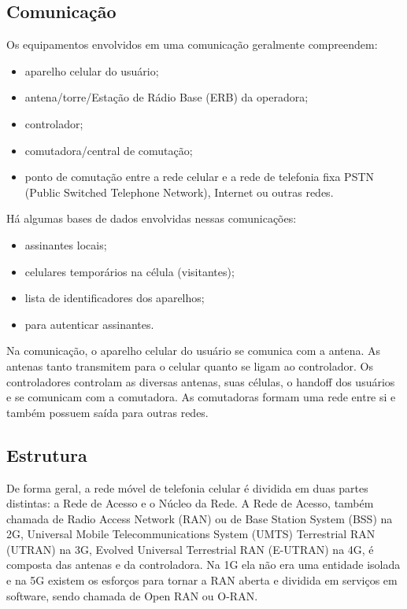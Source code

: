 \documentclass[11pt,oneside,a4paper]{abntex2}
\begin{document}
\subsection*{Comunicação}

Os equipamentos envolvidos em uma comunicação geralmente compreendem:
\begin{itemize}
	\item aparelho celular do usuário;
	\item antena/torre/Estação de Rádio Base (ERB) da operadora;
	\item controlador;
	\item comutadora/central de comutação;
	\item ponto de comutação entre a rede celular e a rede de telefonia fixa PSTN (Public Switched Telephone Network), Internet ou outras redes.
\end{itemize}

Há algumas bases de dados envolvidas nessas comunicações:
\begin{itemize}
	\item assinantes locais;
	\item celulares temporários na célula (visitantes);
	\item lista de identificadores dos aparelhos;
	\item para autenticar assinantes.
\end{itemize}

Na comunicação, o aparelho celular do usuário se comunica com a antena. As antenas tanto transmitem para o celular quanto se ligam ao controlador. Os controladores controlam as diversas antenas, suas células, o handoff dos usuários e se comunicam com a comutadora. As comutadoras formam uma rede entre si e também possuem saída para outras redes.

\subsection*{Estrutura}

De forma geral, a rede móvel de telefonia celular é dividida em duas partes distintas: a Rede de Acesso e o Núcleo da Rede. A Rede de Acesso, também chamada de Radio Access Network (RAN) ou de Base Station System (BSS) na 2G, Universal Mobile Telecommunications System (UMTS) Terrestrial RAN (UTRAN) na 3G, Evolved Universal Terrestrial RAN (E-UTRAN) na 4G, é composta das antenas e da controladora. Na 1G ela não era uma entidade isolada e na 5G existem os esforços para tornar a RAN aberta e dividida em serviços em software, sendo chamada de Open RAN ou O-RAN.
\end{document}
